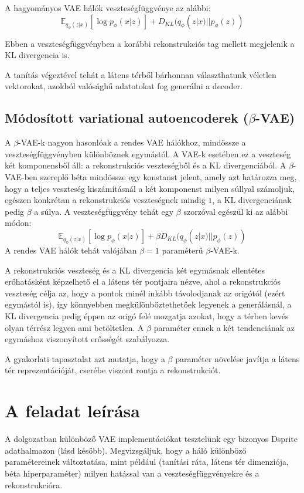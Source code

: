A hagyományos VAE hálók veszteségfüggvénye az alábbi:
$$ \mathbb{E}_{q_\phi(z|x)} [\log p_\phi(x|z)] + D_{KL}(q_\phi(z|x)||p_\phi(z))$$

Ebben a veszteségfüggvényben a korábbi rekonstrukciós tag mellett megjelenik a KL divergencia is.

A tanítás végeztével tehát a látens térből bárhonnan választhatunk véletlen vektorokat, azokból valósághű adatotokat fog generálni a decoder.

\section{Módosított variational autoencoderek ($\beta$-VAE)}

A $\beta$-VAE-k \cite{bVAE2, bvae} nagyon hasonlóak a rendes VAE hálókhoz, mindössze a veszteségfüggvényben különböznek egymástól. A VAE-k esetében ez a veszteség két komponensből áll: a rekonstrukciós veszteségből és a KL divergenciából. A $\beta$-VAE-ben szereplő béta mindössze egy konstanst jelent, amely azt határozza meg, hogy a teljes veszteség kiszámításnál a két komponenst milyen súllyal számoljuk, egészen konkrétan a rekonstrukciós veszteségnek mindig $1$, a KL divergenciának pedig $\beta$ a súlya. A veszteségfüggvény tehát egy $\beta$ szorzóval egészül ki az alábbi módon:
$$ \mathbb{E}_{q_\phi(z|x)} [\log p_\phi(x|z)] + \beta D_{KL}(q_\phi(z|x)||p_\phi(z))$$
A rendes VAE hálók tehát valójában $\beta=1$ paraméterű $\beta$-VAE-k.

A rekonstrukciós veszteség és a KL divergencia két egymásnak ellentétes erőhatásként képzelhető el a látens tér pontjaira nézve, ahol a rekonstrukciós veszteség célja az, hogy a pontok minél inkább távolodjanak az origótól (ezért egymástól is), így könnyebben megkülönböztethetőek legyenek a generálásnál, a KL divergencia pedig éppen az origó felé mozgatja azokat, hogy a térben kevés olyan térrész legyen ami betöltetlen. A $\beta$ paraméter ennek a két tendenciának az egymáshoz viszonyított erősségét szabályozza.

A gyakorlati tapasztalat azt mutatja, hogy a $\beta$ paraméter növelése javítja a látens tér reprezentációját, cserébe viszont rontja a rekonstrukciót.

\chapter{A feladat leírása}

A dolgozatban különböző VAE implementációkat tesztelünk egy bizonyos Dsprite adathalmazon (lásd később). Megvizsgáljuk, hogy a háló különböző paramétereinek változtatása, mint például (tanítási ráta, látens tér dimenziója, béta hiperparaméter) milyen hatással van a veszteségfüggvényekre és a rekonstrukcióra.

